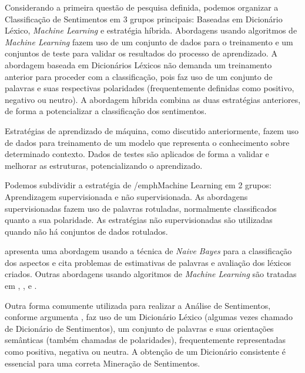 \documentclass[12pt]{article}
\begin{document}
Considerando a primeira questão de pesquisa definida, podemos organizar a Classificação de Sentimentos em 3 grupos principais: Baseadas em Dicionário Léxico, \emph{Machine Learning} e estratégia híbrida. Abordagens usando algoritmos de \emph{Machine Learning} fazem uso de um conjunto de dados para o treinamento e um conjuntos de teste para validar os resultados do processo de aprendizado. A abordagem baseada em Dicionários Léxicos não demanda um treinamento anterior para proceder com a classificação, pois faz uso de um conjunto de palavras e suas respectivas polaridades (frequentemente definidas como positivo, negativo ou neutro). A abordagem híbrida combina as duas estratégias anteriores, de forma a potencializar a classificação dos sentimentos.

Estratégias de aprendizado de máquina, como discutido anteriormente, fazem uso de dados para treinamento de um modelo que representa o conhecimento sobre determinado contexto. Dados de testes são aplicados de forma a validar e melhorar as estruturas, potencializando o aprendizado. 

Podemos subdividir a estratégia de /emph{Machine Learning} em 2 grupos: Aprendizagem supervisionada e não supervisionada. As abordagens supervisionadas fazem uso de palavras rotuladas, normalmente classificados quanto a sua polaridade. As estratégias não supervisionadas são utilizadas quando não há conjuntos de dados rotulados.

\cite{eisenstein2016unsupervised} apresenta uma abordagem usando a técnica de \emph{Naive Bayes} para a classificação dos aspectos e cita problemas de estimativas de palavras e avaliação dos léxicos criados. Outras abordagens usando algoritmos de \emph{Machine Learning} são tratadas em \cite{gilbert2014vader}, \cite{HADDI2013}, \cite{ALGAAL} e \cite{taboada2011lexicon}.

Outra forma comumente utilizada para realizar a Análise de Sentimentos, conforme argumenta \cite{kdir16}, faz uso de um Dicionário Léxico (algumas vezes chamado de Dicionário de Sentimentos), um conjunto de palavras e suas orientações semânticas (também chamadas de polaridades), frequentemente representadas como positiva, negativa ou neutra. A obtenção de um Dicionário consistente é essencial para uma correta Mineração de Sentimentos. 
\end{document}
